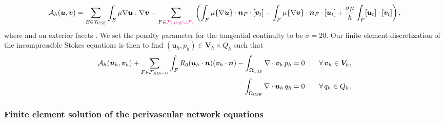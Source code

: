 \begin{multline}
  \mathcal{A}_h(\bm u, \bm v)
  = \sum_{E \in \mathcal{T}_{\rm CSF}} \int_{E} \mu \nabla \bm u : \nabla \bm v
  - \sum_{F \in \mer{\mathcal{F}_{i, \rm CSF} \cup \mathcal{F}_{e}}} \left (
  \int_{F} \mu \{\nabla \bm u\} \cdot \bm n_F \cdot [\bm v_t] 
  - %
  \int_{F} \mu \{\nabla \bm v\}\cdot \bm n_F \cdot [\bm u_t]
  + %
  \frac{\sigma \mu}{h} \int_{F} [\bm u_t ] \cdot [\bm v_t] \right ),   
\end{multline}
where  and on exterior facets . We set the penalty parameter for the tangential continuity to be $\sigma = 20$. Our finite element discretization of the incompressible Stokes equations is then to find $(\bm u_h, p_h) \in \bm V_h \times Q_h$ such that 
\begin{subequations}
\begin{align}
  \mathcal{A}_h(\bm u_h, \bm v_h)
  + \sum_{F \in \mathcal{F}_{\rm AM-U}} \int_{F} R_0 (\bm u_h \cdot \bm n) (\bm v_h \cdot \bm n)
  - \int_{\Omega_{\rm CSF}} \nabla \cdot \bm v_h \, p_h  &= 0 \qquad \forall \, \bm v_h \in \bm V_h, \\ 
\int_{\Omega_{\rm CSF}} \nabla \cdot \bm u_h \, q_h  &= 0 \qquad \forall \, q_h \in Q_h.
\end{align}
\end{subequations}

\subsubsection{Finite element solution of the perivascular network equations} 

